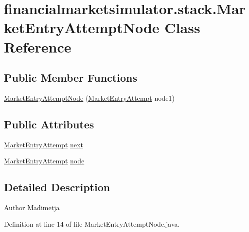 \hypertarget{classfinancialmarketsimulator_1_1stack_1_1_market_entry_attempt_node}{\section{financialmarketsimulator.\+stack.\+Market\+Entry\+Attempt\+Node Class Reference}
\label{classfinancialmarketsimulator_1_1stack_1_1_market_entry_attempt_node}
}
\subsection*{Public Member Functions}
\begin{DoxyCompactItemize}
\item 
\hyperlink{classfinancialmarketsimulator_1_1stack_1_1_market_entry_attempt_node_a1b07a62e05f0a51e7e77edbad7e1b07d}{Market\+Entry\+Attempt\+Node} (\hyperlink{classfinancialmarketsimulator_1_1_market_entry_attempt}{Market\+Entry\+Attempt} node1)
\end{DoxyCompactItemize}
\subsection*{Public Attributes}
\begin{DoxyCompactItemize}
\item 
\hyperlink{classfinancialmarketsimulator_1_1_market_entry_attempt}{Market\+Entry\+Attempt} \hyperlink{classfinancialmarketsimulator_1_1stack_1_1_market_entry_attempt_node_a9671342fa6e35efe9cbf03385e606f32}{next}
\item 
\hyperlink{classfinancialmarketsimulator_1_1_market_entry_attempt}{Market\+Entry\+Attempt} \hyperlink{classfinancialmarketsimulator_1_1stack_1_1_market_entry_attempt_node_a9a2784e51cab776b17f9957dbb2feb04}{node}
\end{DoxyCompactItemize}


\subsection{Detailed Description}
\begin{DoxyAuthor}{Author}
Madimetja 
\end{DoxyAuthor}


Definition at line 14 of file Market\+Entry\+Attempt\+Node.\+java.



